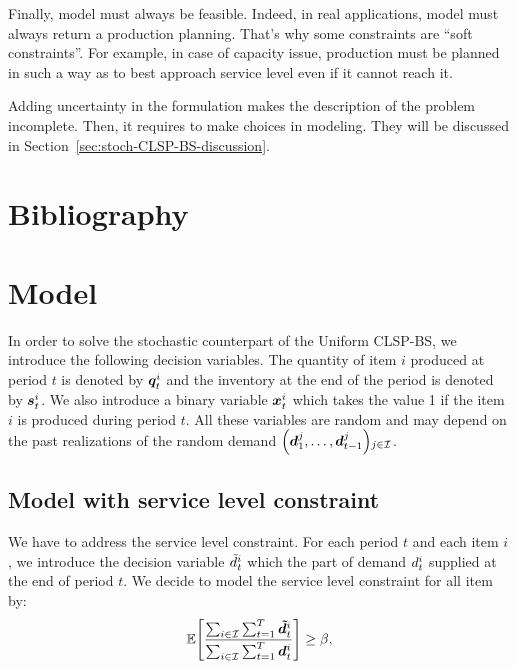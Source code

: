 Finally, model must always be feasible. Indeed, in real applications, model must always return a production planning. That's why some constraints are ``soft constraints''. For example, in case of capacity issue, production must be planned in such a way as to best approach service level even if it cannot reach it.


\medskip

Adding uncertainty in the formulation makes the description of the problem incomplete. Then, it requires to make choices in modeling. They will be discussed in Section~\ref{sec:stoch-CLSP-BS-discussion}.


\section{Bibliography}



\section{Model}


In order to solve the stochastic counterpart of the Uniform CLSP-BS, we introduce the following decision variables. The quantity of item $i$ produced at period $t$ is denoted by $\va\quantity_t^i$ and the inventory at the end of the period is denoted by $\va\inventory_t^i$. We also introduce a binary variable $\va\setup_t^i$ which takes the value 1 if the item $i$ is produced during period $t$. All these variables are random and may depend on the past realizations of the random demand $\bracket{\va\demand_1^j,\ldots,\va\demand_{t-1}^j}_{j\in\REF}$.


\subsection{Model with service level constraint}

We have to address the service level constraint. For each period $t$ and each item $i$, we introduce the decision variable $\tilde{d}_t^i$ which the part of demand $d_t^i$ supplied at the end of period $t$. We decide to model the service level constraint for all item by:
\begin{equation}
  \label{eq:service-level-constraint}
  \espe\sqbracket{ \frac{\sum_{i\in\REF}\sum_{t=1}^{\horizon}\va\supplied_t^i}{\sum_{i\in\REF}\sum_{t=1}^{\horizon}\va\demand_t^i} }
  \geq \servicelvl ,
\end{equation}


